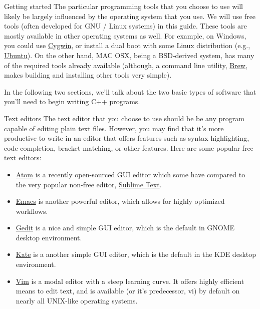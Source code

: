 \documentclass[presentation]{beamer}
\begin{document}
\begin{frame}[fragile,label={sec:orgheadline2}]{Getting started}
 The particular programming tools that you choose to use will
likely be largely influenced by the operating system that you use.
We will use free tools (often developed for GNU / Linux systems) in
this guide. These tools are mostly available in other operating 
systems as well. For example, on Windows, you could use \href{https://www.cygwin.com/}{Cygwin}, or 
install a dual boot with some Linux distribution (e.g., \href{http://www.ubuntu.com/}{Ubuntu}). On the 
other hand, MAC OSX, being a BSD-derived system, has many of the 
required tools already available (although, a command line utility, 
\href{http://brew.sh}{Brew}, makes building and installing other tools very simple).

In the following two sections, we'll talk about the two basic types of 
software that you'll need to begin writing C++ programs.

\begin{block}{Text editors}
The text editor that you choose to use should be be any program 
capable of editing plain text files. However, you may find that it's 
more productive to write in an editor that offers features such as 
syntax highlighting, code-completion, bracket-matching, or other features. 
Here are some popular free text editors:

\begin{itemize}
\item \href{https://atom.io/}{Atom} is a recently open-sourced GUI editor which some have compared to the very popular non-free editor, \href{https://sublimetext.com}{Sublime Text}.
\item \href{https://www.gnu.org/software/emacs/}{Emacs} is another powerful editor, which allows for highly optimized workflows.
\item \href{https://wiki.gnome.org/Apps/Gedit}{Gedit} is a nice and simple GUI editor, which is the default in GNOME desktop environment.
\item \href{https://kate-editor.org}{Kate} is a another simple GUI editor, which is the default in the KDE desktop environment.
\item \href{http://www.vim.org}{Vim} is a modal editor with a steep learning curve. It offers highly efficient means to edit text, and is available (or it's predecessor, vi) by default on nearly all UNIX-like operating systems.
\end{itemize}
\end{block}


\end{frame}
\end{document}
